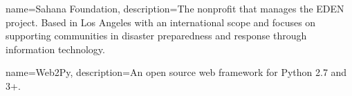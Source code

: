 {
  name=Sahana Foundation,
  description={The nonprofit that manages the EDEN project. Based in Los Angeles with an international scope and focuses on supporting communities in disaster preparedness and response through information technology.}
}

{
  name=Web2Py,
  description={An open source web framework for Python 2.7 and 3+.}
}


